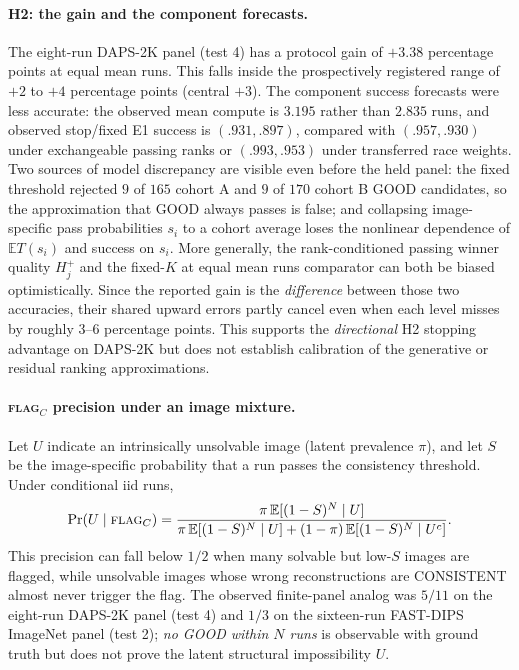 \paragraph{H2: the gain and the component forecasts.}
The eight-run DAPS-2K panel (test 4) has a protocol
gain of $+3.38$ percentage points at equal mean runs.
This falls inside the prospectively registered range
of $+2$ to $+4$ percentage points (central $+3$).
The component success forecasts were less accurate:
the observed mean compute is $3.195$ rather than $2.835$ runs,
and observed stop/fixed E1 success is $(.931,.897)$, compared
with $(.957,.930)$ under exchangeable passing ranks or
$(.993,.953)$ under transferred race weights. Two sources of
model discrepancy are visible even before the held panel:
the fixed threshold rejected $9$ of $165$ cohort A and $9$ of
$170$ cohort B GOOD candidates, so the approximation
that GOOD always passes is false; and collapsing image-specific
pass probabilities $s_i$ to a cohort average loses the nonlinear
dependence of $\mathbb E T(s_i)$ and success on $s_i$.
More generally, the rank-conditioned passing winner quality
$H_j^+$ and the fixed-$K$ at equal mean runs comparator can both
be biased optimistically. Since the reported gain is the
\emph{difference} between those two accuracies, their
shared upward errors partly cancel even when each level
misses by roughly $3$--$6$ percentage points. This supports the
\emph{directional} H2 stopping advantage on DAPS-2K but
does not establish calibration of the generative or residual
ranking approximations.

\paragraph{\textsc{flag}$_C$ precision under an image mixture.}
Let $U$ indicate an intrinsically unsolvable image (latent prevalence
$\pi$), and let $S$ be the image-specific probability that a run
passes the consistency threshold. Under conditional iid runs,
\begin{equation}\label{eq:protocol-flag-precision}
 \Pr(U\mid\textsc{flag}_C)
 =\frac{\pi\,\mathbb E[(1-S)^N\mid U]}
 {\pi\,\mathbb E[(1-S)^N\mid U]
 +(1-\pi)\,\mathbb E[(1-S)^N\mid U^c]}.
\end{equation}
This precision can fall below $1/2$ when many solvable but low-$S$
images are flagged, while unsolvable images whose wrong reconstructions
are CONSISTENT almost never trigger the flag.
The observed finite-panel analog was $5/11$ on the eight-run
DAPS-2K panel (test 4) and $1/3$ on the sixteen-run
FAST-DIPS ImageNet panel (test 2); \emph{no GOOD within $N$ runs} is observable with
ground truth but does not prove the latent structural impossibility $U$.

